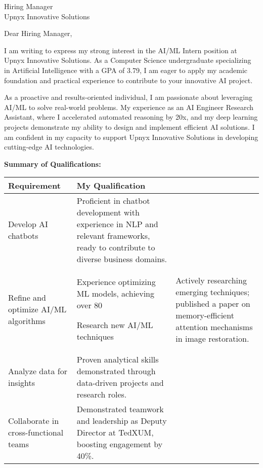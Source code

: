 \documentclass[10.5pt]{letter}
\date{\today}
\begin{document}
\begin{letter}{Hiring Manager\\
Upnyx Innovative Solutions}

\opening{Dear Hiring Manager,}

I am writing to express my strong interest in the AI/ML Intern position at Upnyx Innovative Solutions. As a Computer Science undergraduate specializing in Artificial Intelligence with a GPA of 3.79, I am eager to apply my academic foundation and practical experience to contribute to your innovative AI project.

As a proactive and results-oriented individual, I am passionate about leveraging AI/ML to solve real-world problems. My experience as an AI Engineer Research Assistant, where I accelerated automated reasoning by 20x, and my deep learning projects demonstrate my ability to design and implement efficient AI solutions. I am confident in my capacity to support Upnyx Innovative Solutions in developing cutting-edge AI technologies.

\vspace{0.2cm}
\textbf{Summary of Qualifications:}
\vspace{0.1cm}

\renewcommand{\arraystretch}{1.3}
\begin{tabularx}{\textwidth}{@{}p{}X@{}}
\textbf{Requirement} & \textbf{My Qualification} \\

\hline
Develop AI chatbots & Proficient in chatbot development with experience in NLP and relevant frameworks, ready to contribute to diverse business domains. \\

Refine and optimize AI/ML algorithms & Experience optimizing ML models, achieving over 80%

Research new AI/ML techniques & Actively researching emerging techniques; published a paper on memory-efficient attention mechanisms in image restoration. \\

Analyze data for insights & Proven analytical skills demonstrated through data-driven projects and research roles. \\

Collaborate in cross-functional teams & Demonstrated teamwork and leadership as Deputy Director at TedXUM, boosting engagement by 40\%. \\


\end{tabularx}
\end{letter}
\end{document}
